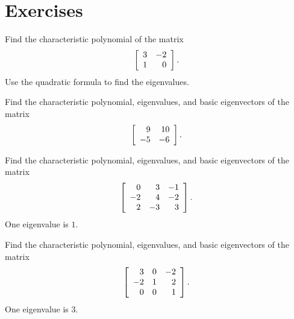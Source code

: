 \documentclass{ximera}
\author{Zack Reed}
\begin{document}
\section*{Exercises}

\begin{exercise}
  Find the characteristic polynomial of the matrix
  \begin{equation*}
    \startmat{rr}
      3 &  -2 \\
      1 &   0 \\
    \stopmat.
  \end{equation*}
  Use the quadratic formula to find the eigenvalues.
\end{exercise}

\begin{exercise}
  Find the characteristic polynomial, eigenvalues, and basic
  eigenvectors of the matrix
  \begin{equation*}
    \startmat{rr}
      9 &  10 \\
      -5 &  -6 \\
    \stopmat.
  \end{equation*}
\end{exercise}

\begin{exercise}
  Find the characteristic polynomial, eigenvalues, and basic
  eigenvectors of the matrix
  \begin{equation*}
    \startmat{rrr}
      0 &   3 &  -1 \\
      -2 &   4 &  -2 \\
      2 &  -3 &   3 \\
    \stopmat.
  \end{equation*}
  One eigenvalue is $1$.
\end{exercise}

\begin{exercise}
  Find the characteristic polynomial, eigenvalues, and basic
  eigenvectors of the matrix
  \begin{equation*}
    \startmat{rrr}
      3 &   0 &  -2 \\
      -2 &   1 &   2 \\
      0 &   0 &   1 \\
    \stopmat.
  \end{equation*}
  One eigenvalue is $3$.
\end{exercise}
\end{document}
